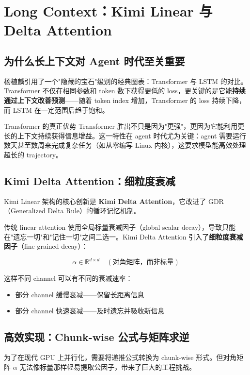 \section{Long Context：Kimi Linear 与 Delta Attention}

\subsection{为什么长上下文对 Agent 时代至关重要}

杨植麟引用了一个"隐藏的宝石"级别的经典图表：Transformer 与 LSTM 的对比。Transformer 不仅在相同参数和 token 数下获得更低的 loss，更关键的是它能\textbf{持续通过上下文改善预测}——随着 token index 增加，Transformer 的 loss 持续下降，而 LSTM 在一定范围后趋于饱和。

\begin{knowledgebox}{Transformer 的真正优势}
Transformer 胜出不只是因为"更强"，更因为它能利用更长的上下文持续获得信息增益。这一特性在 agent 时代尤为关键：agent 需要运行数天甚至数周来完成复杂任务（如从零编写 Linux 内核），这要求模型能高效处理超长的 trajectory。
\end{knowledgebox}

\subsection{Kimi Delta Attention：细粒度衰减}

Kimi Linear 架构的核心创新是 \textbf{Kimi Delta Attention}，它改进了 GDR（Generalized Delta Rule）的循环记忆机制。

传统 linear attention 使用全局标量衰减因子（global scalar decay），导致只能在"遗忘一切"和"记住一切"之间二选一。Kimi Delta Attention 引入了\textbf{细粒度衰减因子}（fine-grained decay）：

$$\alpha \in \mathbb{R}^{d \times d} \quad (\text{对角矩阵，而非标量})$$

这样不同 channel 可以有不同的衰减速率：
\begin{itemize}
    \item 部分 channel 缓慢衰减——保留长距离信息
    \item 部分 channel 快速衰减——及时遗忘并吸收新信息
\end{itemize}

\subsection{高效实现：Chunk-wise 公式与矩阵求逆}

为了在现代 GPU 上并行化，需要将递推公式转换为 chunk-wise 形式。但对角矩阵 $\alpha$ 无法像标量那样轻易提取公因子，带来了巨大的工程挑战。

